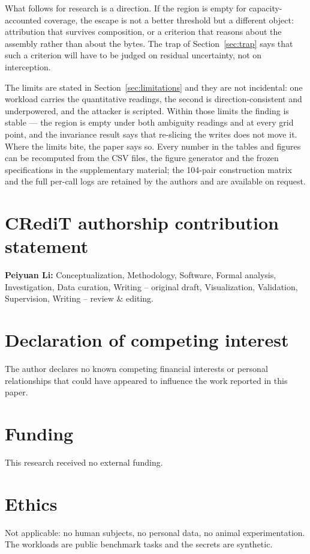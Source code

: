 \documentclass[preprint,12pt]{elsarticle}
\begin{document}
What follows for research is a direction. If the region is empty for capacity-accounted coverage,
the escape is not a better threshold but a different object: attribution that survives composition,
or a criterion that reasons about the assembly rather than about the bytes. The trap of
Section~\ref{sec:trap} says that such a criterion will have to be judged on residual uncertainty, not
on interception.

The limits are stated in Section~\ref{sec:limitations} and they are not incidental: one workload
carries the quantitative readings, the second is direction-consistent and underpowered, and the
attacker is scripted. Within those limits the finding is stable --- the region is empty under both
ambiguity readings and at every grid point, and the invariance result says that re-slicing the
writes does not move it. Where the limits bite, the paper says so. Every number in the tables and figures can be
recomputed from the CSV files, the figure generator and the frozen specifications in the
supplementary material; the 104-pair construction matrix and the full per-call logs are retained
by the authors and are available on request.

\section*{CRediT authorship contribution statement}
\textbf{Peiyuan Li:} Conceptualization, Methodology, Software, Formal analysis, Investigation,
Data curation, Writing -- original draft, Visualization, Validation, Supervision, Writing --
review \& editing.

\section*{Declaration of competing interest}
The author declares no known competing financial interests or personal relationships that could
have appeared to influence the work reported in this paper.

\section*{Funding}
This research received no external funding.

\section*{Ethics}
Not applicable: no human subjects, no personal data, no animal experimentation. The workloads are
public benchmark tasks and the secrets are synthetic.
\end{document}

